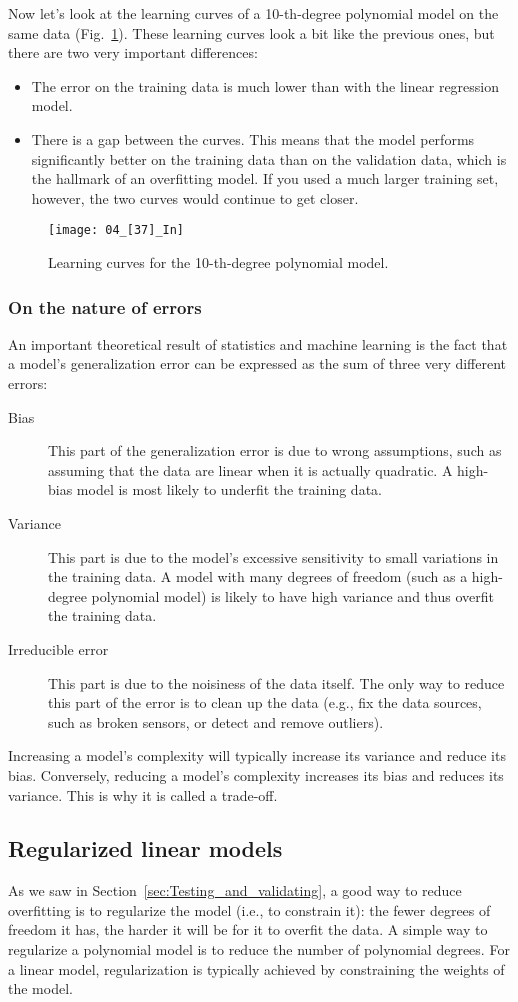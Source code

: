 Now let's look at the learning curves of a 10-th-degree polynomial model on the same data (Fig.~\ref{04_[37]_In}). These learning curves look a bit like the previous ones, but there are two very important differences:
\begin{itemize}
\item The error on the training data is much lower than with the linear regression model.
\item There is a gap between the curves. This means that the model performs significantly better on the training data than on the validation data, which is the hallmark of an overfitting model. If you used a much larger training set, however, the two curves would continue to get closer.
\end{itemize}
\begin{figure}[h!t]
\centering
\texttt{[image: 04\_[37]\_In]}
\caption{Learning curves for the 10-th-degree polynomial model.}\label{04_[37]_In}
\end{figure}
\subsubsection{On the nature of errors}
An important theoretical result of statistics and machine learning is the fact that a model's generalization error can be expressed as the sum of three very different errors:
\begin{description}
\item[Bias] This part of the generalization error is due to wrong assumptions, such as assuming that the data are linear when it is actually quadratic. A high-bias model is most likely to underfit the training data.
\item[Variance] This part is due to the model's excessive sensitivity to small variations in the training data. A model with many degrees of freedom (such as a high-degree polynomial model) is likely to have high variance and thus overfit the training data.
\item[Irreducible error]
This part is due to the noisiness of the data itself. The only way to reduce this part of the error is to clean up the data (e.g., fix the data sources, such as broken sensors, or detect and remove outliers).
\end{description}
Increasing a model's complexity will typically increase its variance and reduce its bias. Conversely, reducing a model's complexity increases its bias and reduces its variance. This is why it is called a trade-off.
\subsection{Regularized linear models}
As we saw in Section~\ref{sec:Testing_and_validating}, a good way to reduce overfitting is to regularize the model (i.e., to constrain it): the fewer degrees of freedom it has, the harder it will be for it to overfit the data. A simple way to regularize a polynomial model is to reduce the number of polynomial degrees. For a linear model, regularization is typically achieved by constraining the weights of the model.
